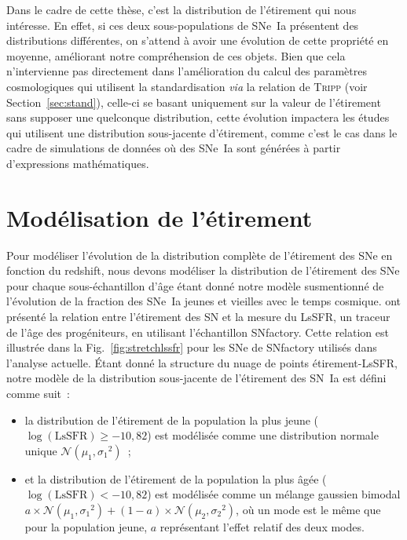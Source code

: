 \documentclass[../main/main.tex]{subfiles}
\begin{document}
Dans le cadre de cette thèse, c'est la distribution de l'étirement qui nous
intéresse. En effet, si ces deux sous-populations de SNe~Ia présentent des
distributions différentes, on s'attend à avoir une évolution de cette propriété
en moyenne, améliorant notre compréhension de ces objets. Bien que cela
n'intervienne pas directement dans l'amélioration du calcul des paramètres
cosmologiques qui utilisent la standardisation \textit{via} la relation de
\textsc{Tripp} (voir Section~\ref{sec:stand}), celle-ci se basant uniquement sur
la valeur de l'étirement sans supposer une quelconque distribution, cette
évolution impactera les études qui utilisent une distribution sous-jacente
d'étirement, comme c'est le cas dans le cadre de simulations de données où des
SNe~Ia sont générées à partir d'expressions mathématiques.

\section{Modélisation de l'étirement}\label{sec:xmod}

Pour modéliser l'évolution de la distribution complète de l'étirement des SNe en
fonction du redshift, nous devons modéliser la distribution de l'étirement des
SNe pour chaque sous-échantillon d'âge étant donné notre modèle susmentionné de
l'évolution de la fraction des SNe~Ia jeunes et vieilles avec le temps cosmique.
\cite{rigault2020} ont présenté la relation entre l'étirement des SN et la
mesure du LsSFR, un traceur de l'âge des progéniteurs, en utilisant
l'échantillon SNfactory. Cette relation est illustrée dans la
Fig.~\ref{fig:stretchlssfr} pour les SNe de SNfactory utilisés dans l'analyse
actuelle. Étant donné la structure du nuage de points étirement-LsSFR, notre
modèle de la distribution sous-jacente de l'étirement des SN~Ia est défini comme
suit~:
\begin{itemize}
    \item la distribution de l'étirement de la population la plus jeune
        ($\log(\mathrm{LsSFR})\geq-10,82$) est modélisée comme une distribution
        normale unique $\mathcal{N}(\mu_1, \sigma_1{}^2)$~;
    \item et la distribution de l'étirement de la population la plus âgée
        ($\log(\mathrm{LsSFR})<-10,82$) est modélisée comme un mélange gaussien
        bimodal $a\times \mathcal{N} (\mu_1, \sigma_1{}^2) + (1-a)\times
        \mathcal{N}(\mu_2, \sigma_2{}^2)$, où un mode est le même que pour la
        population jeune, $a$ représentant l'effet relatif des deux modes.
\end{itemize}
\end{document}
